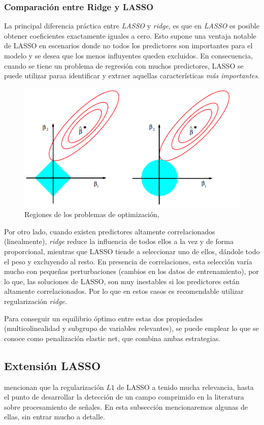 \documentclass{article}
\begin{document}
\subsubsection{Comparación entre Ridge y LASSO}
La principal diferencia práctica entre \textit{LASSO} y \textit{ridge}, es que en \textit{LASSO} es posible obtener coeficientes exactamente iguales a cero. Esto supone una ventaja notable de LASSO en escenarios donde no todos los predictores son importantes para el modelo y se desea que los menos influyentes queden excluidos. En consecuencia, cuando se tiene un problema de regresión con muchos predictores, LASSO se puede utilizar paraa identificar y extraer aquellas características \textit{más importantes}.
\begin{figure}[H]
\centering
\includegraphics[scale=0.5]{figure/comparacion_regiones.png}
\caption{Regiones de los problemas de optimización, \citep{statisticallearning}}
\end{figure}
Por otro lado, cuando existen predictores altamente correlacionados (linealmente), \textit{ridge} reduce la influencia de todos ellos a la vez y de forma proporcional, mientras que LASSO tiende a seleccionar uno de ellos, dándole todo el peso y excluyendo al resto. En presencia de correlaciones, esta selección varía mucho con pequeñas perturbaciones (cambios en los datos de entrenamiento), por lo que, las soluciones de LASSO, son muy inestables si los predictores están altamente correlacionados. Por lo que en estos casos es recomendable utilizar regularización \textit{ridge.}

Para conseguir un equilibrio óptimo entre estas dos propiedades (multicolinealidad y subgrupo de variables relevantes), se puede emplear lo que se conoce como penalización elastic net, que combina ambas estrategias.

\subsection{Extensión LASSO}
\cite{statisticallearning} mencionan que la regularización $L1$ de LASSO a tenido mucha relevancia, hasta el punto de desarrollar la detección de un campo comprimido en la literatura sobre procesamiento de señales. En esta subsección mencionaremos algunas de ellas, sin entrar mucho a detalle.
\end{document}
